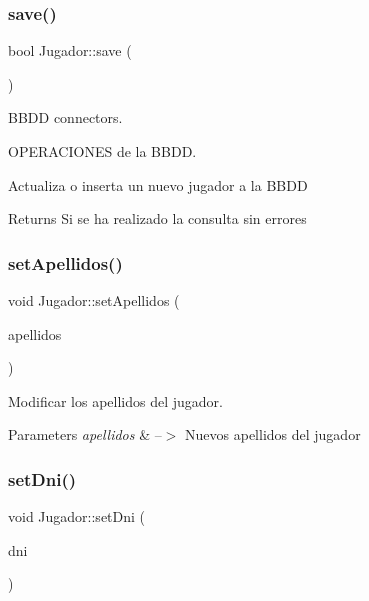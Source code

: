\subsubsection{\texorpdfstring{save()}{save()}}
{\footnotesize\ttfamily bool Jugador\+::save (\begin{DoxyParamCaption}{ }\end{DoxyParamCaption})}



B\+B\+DD connectors. 

O\+P\+E\+R\+A\+C\+I\+O\+N\+ES de la B\+B\+DD.

Actualiza o inserta un nuevo jugador a la B\+B\+DD \begin{DoxyReturn}{Returns}
Si se ha realizado la consulta sin errores 
\end{DoxyReturn}
\mbox{\label{classJugador_ad272be7c6b113eee1c9baf1262c4ad95}} 
\subsubsection{\texorpdfstring{set\+Apellidos()}{setApellidos()}}
{\footnotesize\ttfamily void Jugador\+::set\+Apellidos (\begin{DoxyParamCaption}\item[{Q\+String}]{apellidos }\end{DoxyParamCaption})}



Modificar los apellidos del jugador. 


\begin{DoxyParams}{Parameters}
{\em apellidos} & --$>$ Nuevos apellidos del jugador \\
\hline
\end{DoxyParams}
\mbox{\label{classJugador_af2b5ddb5d0b2cc80867ba54cf4cea564}} 
\subsubsection{\texorpdfstring{set\+Dni()}{setDni()}}
{\footnotesize\ttfamily void Jugador\+::set\+Dni (\begin{DoxyParamCaption}\item[{Q\+String}]{dni }\end{DoxyParamCaption})}



